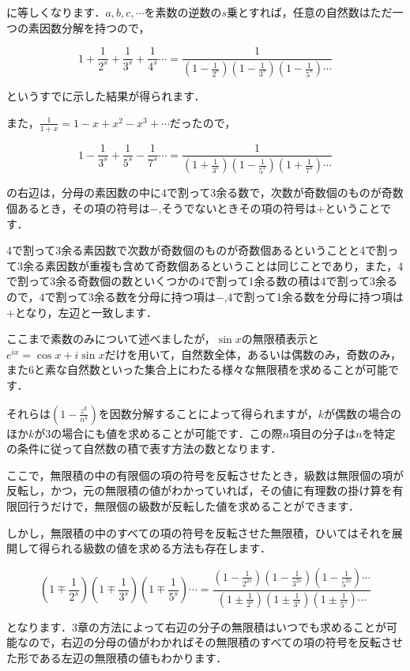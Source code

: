 \documentclass[./main]{subfiles}
\theoremstyle{break}
\begin{document}
に等しくなります．$a,b,c,\cdots$を素数の逆数の$s$乗とすれば，任意の自然数はただ一つの素因数分解を持つので，

\[1+\frac{1}{2^s}+\frac{1}{3^s}+\frac{1}{4^s}\cdots =\frac{1}{\left( 1-\frac{1}{2^s} \right)\left( 1-\frac{1}{3^s} \right)\left( 1-\frac{1}{5^s} \right)\cdots}\]

というすでに示した結果が得られます．

また，$\frac{1}{1+x}=1-x+x^2-x^3+\cdots$だったので，

\[1-\frac{1}{3^s}+\frac{1}{5^s}-\frac{1}{7^s}\cdots =\frac{1}{\left( 1+\frac{1}{3^s} \right)\left( 1-\frac{1}{5^s} \right)\left( 1+\frac{1}{7^s} \right)\cdots}\]

の右辺は，分母の素因数の中に4で割って3余る数で，次数が奇数個のものが奇数個あるとき，その項の符号は$-$,そうでないときその項の符号は$+$ということです．

4で割って3余る素因数で次数が奇数個のものが奇数個あるということと4で割って3余る素因数が重複も含めて奇数個あるということは同じことであり，また，4で割って3余る奇数個の数といくつかの4で割って1余る数の積は4で割って3余るので，4で割って3余る数を分母に持つ項は$-$,4で割って1余る数を分母に持つ項は$+$となり，左辺と一致します．

ここまで素数のみについて述べましたが，$\sin x$の無限積表示と$e^{ix}=\cos x+i\sin x$だけを用いて，自然数全体，あるいは偶数のみ，奇数のみ，また6と素な自然数といった集合上にわたる様々な無限積を求めることが可能です．

それらは$\left( 1-\frac{z^k}{n^k} \right)$を因数分解することによって得られますが，$k$が偶数の場合のほか$k$が3の場合にも値を求めることが可能です．この際$n$項目の分子は$n$を特定の条件に従って自然数の積で表す方法の数となります．

ここで，無限積の中の有限個の項の符号を反転させたとき，級数は無限個の項が反転し，かつ，元の無限積の値がわかっていれば，その値に有理数の掛け算を有限回行うだけで，無限個の級数が反転した値を求めることができます．

しかし，無限積の中のすべての項の符号を反転させた無限積，ひいてはそれを展開して得られる級数の値を求める方法も存在します．

\[\left( 1\mp \frac{1}{2^s} \right)\left( 1\mp \frac{1}{3^s} \right)\left( 1\mp\frac{1}{5^s} \right)\cdots=\frac{\left( 1-\frac{1}{2^{2s}} \right)\left( 1-\frac{1}{3^{2s}} \right)\left( 1-\frac{1}{5^{2s}} \right)\cdots}{\left( 1\pm \frac{1}{2^s} \right)\left( 1\pm \frac{1}{3^s} \right)\left( 1\pm\frac{1}{5^s} \right)\cdots}\]

となります．3章の方法によって右辺の分子の無限積はいつでも求めることが可能なので，右辺の分母の値がわかればその無限積のすべての項の符号を反転させた形である左辺の無限積の値もわかります．
\end{document}
